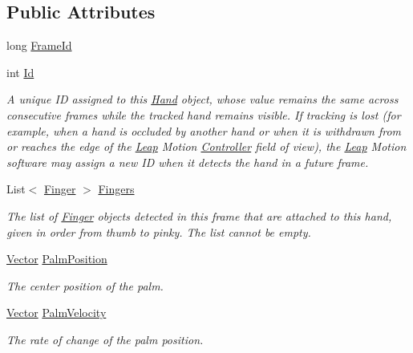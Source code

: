 \subsection*{Public Attributes}
\begin{DoxyCompactItemize}
\item 
long \mbox{\hyperlink{class_leap_1_1_hand_a37401850c4786b6c7c812db7bdd201ce}{Frame\+Id}}
\item 
int \mbox{\hyperlink{class_leap_1_1_hand_ac7bfb32524382f4c9e4fb830437fe72b}{Id}}
\begin{DoxyCompactList}\small\item\em A unique ID assigned to this \mbox{\hyperlink{class_leap_1_1_hand}{Hand}} object, whose value remains the same across consecutive frames while the tracked hand remains visible. If tracking is lost (for example, when a hand is occluded by another hand or when it is withdrawn from or reaches the edge of the \mbox{\hyperlink{namespace_leap}{Leap}} Motion \mbox{\hyperlink{class_leap_1_1_controller}{Controller}} field of view), the \mbox{\hyperlink{namespace_leap}{Leap}} Motion software may assign a new ID when it detects the hand in a future frame. \end{DoxyCompactList}\item 
List$<$ \mbox{\hyperlink{class_leap_1_1_finger}{Finger}} $>$ \mbox{\hyperlink{class_leap_1_1_hand_ac9f68349507bfa13e3ac24738382bea6}{Fingers}}
\begin{DoxyCompactList}\small\item\em The list of \mbox{\hyperlink{class_leap_1_1_finger}{Finger}} objects detected in this frame that are attached to this hand, given in order from thumb to pinky. The list cannot be empty. \end{DoxyCompactList}\item 
\mbox{\hyperlink{struct_leap_1_1_vector}{Vector}} \mbox{\hyperlink{class_leap_1_1_hand_aaf0940b9108e92c22e33b9c6cd32921a}{Palm\+Position}}
\begin{DoxyCompactList}\small\item\em The center position of the palm. \end{DoxyCompactList}\item 
\mbox{\hyperlink{struct_leap_1_1_vector}{Vector}} \mbox{\hyperlink{class_leap_1_1_hand_a61f0daa7259d6c5fe03b9466d4743b43}{Palm\+Velocity}}
\begin{DoxyCompactList}\small\item\em The rate of change of the palm position. \end{DoxyCompactList}\item 

\end{DoxyCompactItemize}

